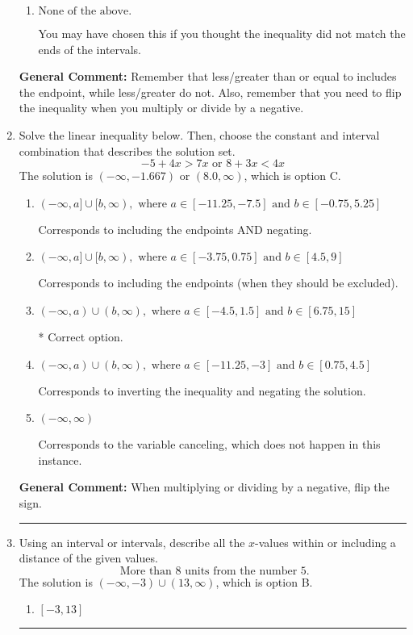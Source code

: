\documentclass{extbook}[14pt]
\newcommand{\litem}[1]{\item #1

\rule{\textwidth}{0.4pt}}
\begin{document}
\begin{enumerate}
{\begin{enumerate}[label=\Alph*.]
 $(-\infty, -7.0)$, which corresponds to switching the direction of the interval. You likely did this if you did not flip the inequality when dividing by a negative!
\item \( \text{None of the above}. \)

You may have chosen this if you thought the inequality did not match the ends of the intervals.
\end{enumerate}

\textbf{General Comment:} Remember that less/greater than or equal to includes the endpoint, while less/greater do not. Also, remember that you need to flip the inequality when you multiply or divide by a negative.
}
\litem{
Solve the linear inequality below. Then, choose the constant and interval combination that describes the solution set.
\[ -5 + 4 x > 7 x \text{ or } 8 + 3 x < 4 x \]The solution is \( (-\infty, -1.667) \text{ or } (8.0, \infty) \), which is option C.\begin{enumerate}[label=\Alph*.]
\item \( (-\infty, a] \cup [b, \infty), \text{ where } a \in [-11.25, -7.5] \text{ and } b \in [-0.75, 5.25] \)

Corresponds to including the endpoints AND negating.
\item \( (-\infty, a] \cup [b, \infty), \text{ where } a \in [-3.75, 0.75] \text{ and } b \in [4.5, 9] \)

Corresponds to including the endpoints (when they should be excluded).
\item \( (-\infty, a) \cup (b, \infty), \text{ where } a \in [-4.5, 1.5] \text{ and } b \in [6.75, 15] \)

 * Correct option.
\item \( (-\infty, a) \cup (b, \infty), \text{ where } a \in [-11.25, -3] \text{ and } b \in [0.75, 4.5] \)

Corresponds to inverting the inequality and negating the solution.
\item \( (-\infty, \infty) \)

Corresponds to the variable canceling, which does not happen in this instance.
\end{enumerate}

\textbf{General Comment:} When multiplying or dividing by a negative, flip the sign.
}
\litem{
Using an interval or intervals, describe all the $x$-values within or including a distance of the given values.
\[ \text{ More than } 8 \text{ units from the number } 5. \]The solution is \( (-\infty, -3) \cup (13, \infty) \), which is option B.\begin{enumerate}[label=\Alph*.]
\item \( [-3, 13] \)


\end{enumerate}}
\end{enumerate}
\end{document}
